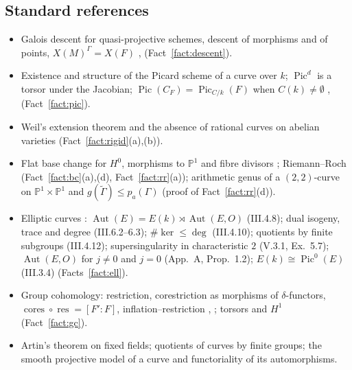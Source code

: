 \documentclass[11pt]{amsart}
\theoremstyle{definition}
\theoremstyle{remark}
\newcommand{\PP}{\mathbb P}
\newcommand{\res}{\operatorname{res}}
\newcommand{\cores}{\operatorname{cores}}
\newcommand{\Pic}{\operatorname{Pic}}
\newcommand{\Aut}{\operatorname{Aut}}
\begin{document}
\subsection*{Standard references}
\begin{itemize}
\item Galois descent for quasi-projective schemes, descent of morphisms and of points,
$X(M)^\Gamma=X(F)$ \cite[6.1--6.2]{BLR}, \cite[V.20]{SeAG} (Fact~\ref{fact:descent}).
\item Existence and structure of the Picard scheme of a curve over $k$; $\Pic^d$ is a
torsor under the Jacobian; $\Pic(C_F)=\Pic_{C/k}(F)$ when $C(k)\ne\emptyset$
\cite[8.1, 8.2, 8.4]{BLR}, \cite{Kl} (Fact~\ref{fact:pic}).
\item Weil's extension theorem and the absence of rational curves on abelian varieties
\cite[Thm.~3.1, Cor.~3.8]{Mi} (Fact~\ref{fact:rigid}(a),(b)).
\item Flat base change for $H^0$, morphisms to $\PP^1$ and fibre divisors
\cite[II.6, III.9.3]{Ha}; Riemann--Roch \cite[IV.1.3]{Ha} (Fact~\ref{fact:bc}(a),(d),
Fact~\ref{fact:rr}(a)); arithmetic genus of a $(2,2)$-curve on $\PP^1\times\PP^1$ and
$g(\tilde\Gamma)\le p_a(\Gamma)$ (proof of Fact~\ref{fact:rr}(d)).
\item Elliptic curves \cite{Sil}: $\Aut(E)=E(k)\rtimes\Aut(E,O)$ (III.4.8); dual isogeny,
trace and degree (III.6.2--6.3); $\#\ker\le\deg$ (III.4.10); quotients by finite
subgroups (III.4.12); supersingularity in characteristic $2$ (V.3.1, Ex.~5.7);
$\Aut(E,O)$ for $j\ne0$ and $j=0$ (App.~A, Prop.~1.2); $E(k)\cong\Pic^0(E)$ (III.3.4)
(Facts~\ref{fact:ell}).
\item Group cohomology: restriction, corestriction as morphisms of $\delta$-functors,
$\cores\circ\res=[F':F]$, inflation--restriction \cite[Ch.~I, \S1.5]{NSW}, \cite[I.2, I.5]{Se};
torsors and $H^1$ \cite[I.5]{Se} (Fact~\ref{fact:gc}).
\item Artin's theorem on fixed fields; quotients of curves by finite groups; the smooth
projective model of a curve and functoriality of its automorphisms.
\end{itemize}
\end{document}
